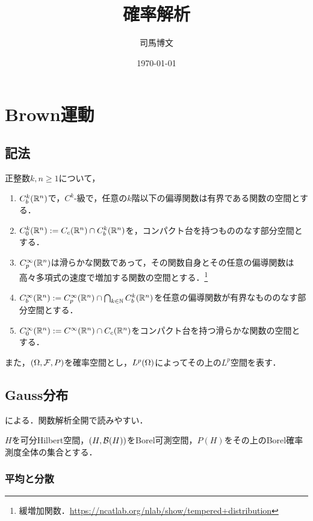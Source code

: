 \documentclass[uplatex,dvipdfmx]{jsreport}
\title{確率解析}
\author{司馬博文}
\date{\today}
\begin{document}
\tableofcontents

\chapter{Brown運動}

\section{記法}

\begin{notation}
    正整数$k,n\ge1$について，
    \begin{enumerate}
        \item $C_b^k(\mathbb{R}^n)$で，$C^k$-級で，任意の$k$階以下の偏導関数は有界である関数の空間とする．
        \item $C_0^k(\mathbb{R}^n):=C_c(\mathbb{R}^n)\cap C_b^k(\mathbb{R}^n)$を，コンパクト台を持つもののなす部分空間とする．
        \item $C_p^\infty(\mathbb{R}^n)$は滑らかな関数であって，その関数自身とその任意の偏導関数は高々多項式の速度で増加する関数の空間とする．\footnote{緩増加関数．\url{https://ncatlab.org/nlab/show/tempered+distribution}}
        \item $C_b^\infty(\mathbb{R}^n):=C_p^\infty(\mathbb{R}^n)\cap\bigcap_{k\in\mathbb{N}}C_b^k(\mathbb{R}^n)$を任意の偏導関数が有界なもののなす部分空間とする．
        \item $C_0^\infty(\mathbb{R}^n):=C^\infty(\mathbb{R}^n)\cap C_c(\mathbb{R}^n)$をコンパクト台を持つ滑らかな関数の空間とする．
    \end{enumerate}
    また，$(\Omega,\mathcal{F},P)$を確率空間とし，$L^p(\Omega)$によってその上の$L^p$空間を表す．
\end{notation}

\section{Gauss分布}

\begin{tcolorbox}[colframe=ForestGreen, colback=ForestGreen!10!white,breakable,colbacktitle=ForestGreen!40!white,coltitle=black,fonttitle=\bfseries\sffamily,
title=]
    \cite{Prato}による．関数解析全開で読みやすい．
\end{tcolorbox}

\begin{notation}
    $H$を可分Hilbert空間，$(H,\mathcal{B}(H))$をBorel可測空間，$P(H)$をその上のBorel確率測度全体の集合とする．
\end{notation}

\subsection{平均と分散}
\end{document}
